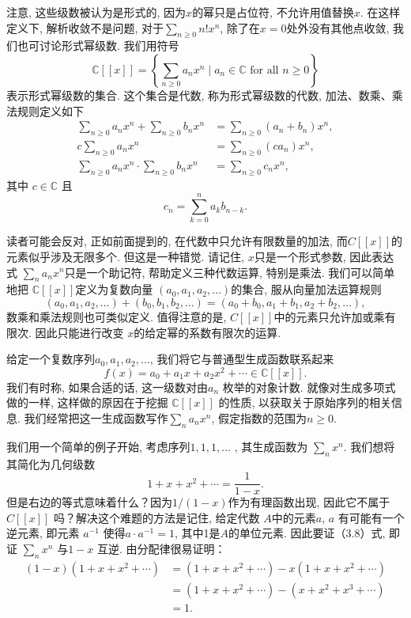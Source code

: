 \documentclass[a4paper,12pt]{ctexbook}
\begin{document}
注意, 这些级数被认为是形式的, 因为$x$的幂只是占位符, 不允许用值替换$x$. 在这样定义下, 解析收敛不是问题, 对于$\sum_{n \geq 0} n ! x^{n}$, 除了在$x=0$处外没有其他点收敛, 我们也可讨论形式幂级数. 我们用符号
$$
\mathbb{C}[[x]]=\left\{\sum_{n \geq 0} a_{n} x^{n} \mid a_{n} \in \mathbb{C} \text { for all } n \geq 0\right\}
$$表示形式幂级数的集合. 这个集合是代数, 称为{\kaishu 形式幂级数的代数}, 加法、数乘、乘法规则定义如下
$$
\begin{aligned}
\sum_{n \geq 0} a_{n} x^{n}+\sum_{n \geq 0} b_{n} x^{n} &=\sum_{n \geq 0}\left(a_{n}+b_{n}\right) x^{n}, \\
c \sum_{n \geq 0} a_{n} x^{n} &=\sum_{n \geq 0}\left(c a_{n}\right) x^{n}, \\
\sum_{n \geq 0} a_{n} x^{n} \cdot \sum_{n \geq 0} b_{n} x^{n} &=\sum_{n \geq 0} c_{n} x^{n},
\end{aligned}
$$
其中 $c \in \mathbb{C}$ 且
$$
c_{n}=\sum_{k=0}^{n} a_{k} b_{n-k}.
$$

读者可能会反对, 正如前面提到的, 在代数中只允许有限数量的加法, 而$C[[x]]$的元素似乎涉及无限多个. 但这是一种错觉. 请记住, $x$只是一个形式参数, 因此表达式 $\sum_{n} a_{n} x^{n}$只是一个助记符, 帮助定义三种代数运算, 特别是乘法. 我们可以简单地把 $\mathbb{C}[[x]]$定义为复数向量 $\left(a_{0}, a_{1}, a_{2}, \ldots\right)$的集合, 服从向量加法运算规则
$$
\left(a_{0}, a_{1}, a_{2}, \ldots\right)+\left(b_{0}, b_{1}, b_{2}, \ldots\right)=\left(a_{0}+b_{0}, a_{1}+b_{1}, a_{2}+b_{2}, \ldots\right),
$$
数乘和乘法规则也可类似定义. 值得注意的是,  $C[[x]]$中的元素只允许加或乘有限次. 因此只能进行改变 $x$的给定幂的系数有限次的运算.

给定一个复数序列$a_{0}, a_{1}, a_{2}, \ldots$, 我们将它与普通型生成函数联系起来
$$
f(x)=a_{0}+a_{1} x+a_{2} x^{2}+\cdots \in \mathbb{C}[[x]].
$$
我们有时称, 如果合适的话, 这一级数对由$a_{n}$ 枚举的对象计数. 就像对生成多项式做的一样, 这样做的原因在于挖掘 $\mathbb{C}[[x]]$ 的性质, 以获取关于原始序列的相关信息. 我们经常把这一生成函数写作$\sum_{n} a_{n} x^{n}$, 假定指数的范围为$n \geq 0 $.

我们用一个简单的例子开始, 考虑序列$1,1,1, \ldots$ , 其生成函数为 $\sum_{n} x^{n}$. 我们想将其简化为几何级数
\[
1+x+x^{2}+\cdots=\frac{1}{1-x}.\tag{3.8}
\]
但是右边的等式意味着什么？因为$1 /(1-x)$作为有理函数出现, 因此它不属于$C[[x]]$ 吗？解决这个难题的方法是记住, 给定代数 $A$中的元素$a$, $a$ 有可能有一个逆元素, 即元素 $a^{-1}$ 使得$a\cdot a^{-1}=1$, 其中1是$A$的单位元素. 因此要证（3.8）式, 即证 $\sum_{n} x^{n}$ 与$1-x$ 互逆. 由分配律很易证明：
$$
\begin{aligned}
(1-x)\left(1+x+x^{2}+\cdots\right) &=\left(1+x+x^{2}+\cdots\right)-x\left(1+x+x^{2}+\cdots\right) \\
&=\left(1+x+x^{2}+\cdots\right)-\left(x+x^{2}+x^{3}+\cdots\right) \\
&=1 .
\end{aligned}
$$
\end{document}
